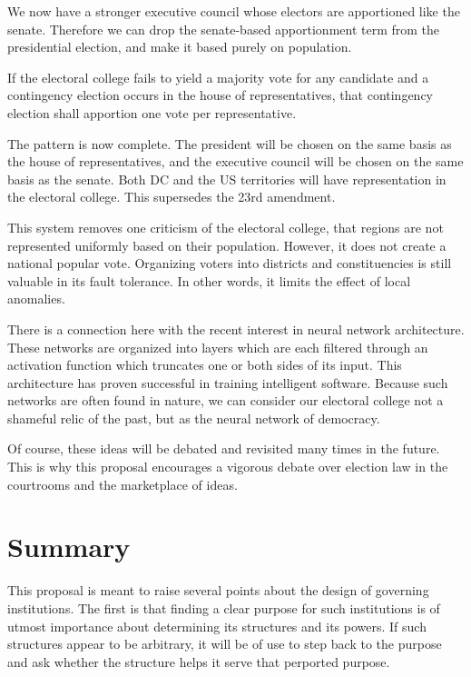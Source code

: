 \documentclass{article}
\begin{document}
We now have a stronger executive council whose electors are apportioned like the senate. Therefore we can drop the senate-based apportionment term from the presidential election, and make it based purely on population.

\begin{quoting}
If the electoral college fails to yield a majority vote for any candidate and a contingency election occurs in the house of representatives, that contingency election shall apportion one vote per representative.
\end{quoting}

The pattern is now complete. The president will be chosen on the same basis as the house of representatives, and the executive council will be chosen on the same basis as the senate. Both DC and the US territories will have representation in the electoral college. This supersedes the 23rd amendment.

This system removes one criticism of the electoral college, that regions are not represented uniformly based on their population. However, it does not create a national popular vote. Organizing voters into districts and constituencies is still valuable in its fault tolerance. In other words, it limits the effect of local anomalies.

There is a connection here with the recent interest in neural network architecture. These networks are organized into layers which are each filtered through an activation function which truncates one or both sides of its input. This architecture has proven successful in training intelligent software. Because such networks are often found in nature, we can consider our electoral college not a shameful relic of the past, but as the neural network of democracy.

Of course, these ideas will be debated and revisited many times in the future. This is why this proposal encourages a vigorous debate over election law in the courtrooms and the marketplace of ideas.

\section{Summary}

This proposal is meant to raise several points about the design of governing institutions. The first is that finding a clear purpose for such institutions is of utmost importance about determining its structures and its powers. If such structures appear to be arbitrary, it will be of use to step back to the purpose and ask whether the structure helps it serve that perported purpose.
\end{document}
